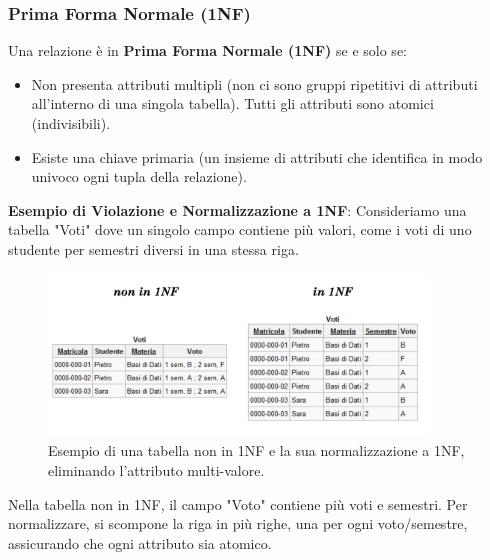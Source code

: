\subsubsection{Prima Forma Normale (1NF)}
Una relazione è in \textbf{Prima Forma Normale (1NF)} se e solo se:
\begin{itemize}
    \item Non presenta attributi multipli (non ci sono gruppi ripetitivi di attributi all'interno di una singola tabella). Tutti gli attributi sono atomici (indivisibili).
    \item Esiste una chiave primaria (un insieme di attributi che identifica in modo univoco ogni tupla della relazione).
\end{itemize}
\textbf{Esempio di Violazione e Normalizzazione a 1NF}:
Consideriamo una tabella "Voti" dove un singolo campo contiene più valori, come i voti di uno studente per semestri diversi in una stessa riga.
\begin{figure}[h!]
    \centering
    \includegraphics[width=0.9\textwidth]{immagini/nf_1nf_esempio_voti.png} %
    \caption{Esempio di una tabella non in 1NF e la sua normalizzazione a 1NF, eliminando l'attributo multi-valore.}
    \label{fig:nf_1nf_esempio_voti}
\end{figure}
Nella tabella non in 1NF, il campo "Voto" contiene più voti e semestri. Per normalizzare, si scompone la riga in più righe, una per ogni voto/semestre, assicurando che ogni attributo sia atomico.


